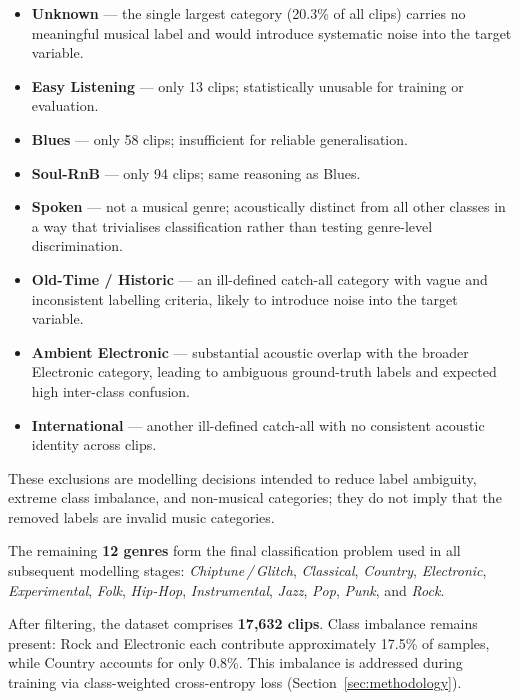 \documentclass[12pt, a4paper]{article}
\begin{document}
\begin{itemize}[noitemsep, topsep=4pt]
    \item \textbf{Unknown} --- the single largest category (20.3\% of
          all clips) carries no meaningful musical label and would
          introduce systematic noise into the target variable.
    \item \textbf{Easy Listening} --- only 13 clips; statistically
          unusable for training or evaluation.
    \item \textbf{Blues} --- only 58 clips; insufficient for reliable
          generalisation.
    \item \textbf{Soul-RnB} --- only 94 clips; same reasoning as Blues.
    \item \textbf{Spoken} --- not a musical genre; acoustically distinct
          from all other classes in a way that trivialises classification
          rather than testing genre-level discrimination.
    \item \textbf{Old-Time / Historic} --- an ill-defined catch-all
          category with vague and inconsistent labelling criteria, likely
          to introduce noise into the target variable.
    \item \textbf{Ambient Electronic} --- substantial acoustic overlap
          with the broader Electronic category, leading to ambiguous
          ground-truth labels and expected high inter-class confusion.
    \item \textbf{International} --- another ill-defined catch-all with
          no consistent acoustic identity across clips.
\end{itemize}

These exclusions are modelling decisions intended to reduce label ambiguity, extreme
class imbalance, and non-musical categories; they do not imply that the removed labels
are invalid music categories.

The remaining \textbf{12 genres} form the final classification problem
used in all subsequent modelling stages:
\textit{Chiptune\,/\,Glitch}, \textit{Classical}, \textit{Country},
\textit{Electronic}, \textit{Experimental}, \textit{Folk},
\textit{Hip-Hop}, \textit{Instrumental}, \textit{Jazz}, \textit{Pop},
\textit{Punk}, and \textit{Rock}.

After filtering, the dataset comprises \textbf{17{,}632 clips}.
Class imbalance remains present: Rock and Electronic each contribute
approximately 17.5\% of samples, while Country accounts for only 0.8\%.
This imbalance is addressed during training via class-weighted
cross-entropy loss (Section~\ref{sec:methodology}).
\end{document}
